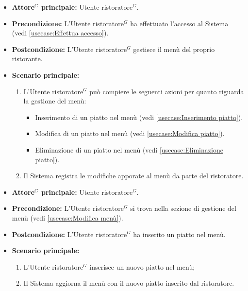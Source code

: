 \label{usecase:Modifica menù}
\begin{itemize}
	\item \textbf{\gls{Attore}$^G$ principale:} \gls{Utente ristoratore}$^G$.

	\item \textbf{Precondizione:} L'\gls{Utente ristoratore}$^G$ ha effettuato l'accesso al Sistema (vedi \autoref{usecase:Effettua accesso}).

	\item \textbf{Postcondizione:} L'\gls{Utente ristoratore}$^G$ gestisce il menù del proprio ristorante.


	\item \textbf{Scenario principale:}
	      \begin{enumerate}

		      \item L'\gls{Utente ristoratore}$^G$ può compiere le seguenti azioni per quanto riguarda la gestione del menù:
		      \begin{itemize}
                \item Inserimento di un piatto nel menù (vedi \autoref{usecase:Inserimento piatto}).
                \item Modifica di un piatto nel menù (vedi \autoref{usecase:Modifica piatto}).
                \item Eliminazione di un piatto nel menù (vedi \autoref{usecase:Eliminazione piatto}).
              \end{itemize}
		      \item Il Sistema registra le modifiche apporate al menù da parte del ristoratore.

	      \end{enumerate}
\end{itemize}

\label{usecase:Inserimento piatto}
\begin{itemize}

	\item \textbf{\gls{Attore}$^G$ principale:} \gls{Utente ristoratore}$^G$.

	\item \textbf{Precondizione:} L'\gls{Utente ristoratore}$^G$ si trova nella sezione di gestione del menù (vedi \autoref{usecase:Modifica menù}).

	\item \textbf{Postcondizione:} L'\gls{Utente ristoratore}$^G$ ha inserito un piatto nel menù.

	\item \textbf{Scenario principale:}
	\begin{enumerate}
		\item L'\gls{Utente ristoratore}$^G$ inserisce un nuovo piatto nel menù;
		\item Il Sistema aggiorna il menù con il nuovo piatto inserito dal ristoratore.
	\end{enumerate}

\end{itemize}


